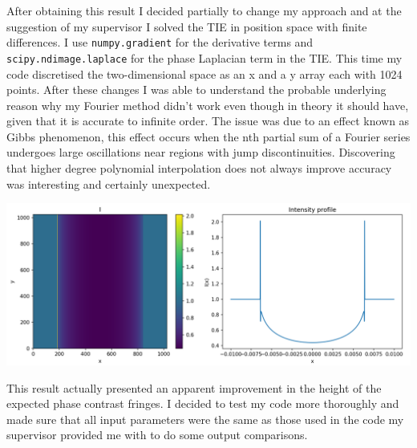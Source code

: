 \documentclass[9pt, a4paper]{article}
\newenvironment{Figure}
    {\par\medskip\noindent\minipage{\linewidth}}
    {\endminipage\par\medskip}
\begin{document}
After obtaining this result I decided partially to change my approach and at the suggestion of my supervisor I solved the TIE in position space with finite differences. I use \texttt{numpy.gradient} for the derivative terms and \texttt{scipy.ndimage.laplace} for the phase Laplacian term in the TIE. This time my code discretised the two-dimensional space as an x and a y array each with 1024 points. 
After these changes I was able to understand the probable underlying reason why my Fourier method didn't work even though in theory it should have, given that it is accurate to infinite order\cite{Chris}\cite{Fornberg}. The issue was due to an effect known as Gibbs phenomenon, this effect occurs when the nth partial sum of a Fourier series undergoes large oscillations near regions with jump discontinuities\cite{Gibbs}. Discovering that higher degree polynomial interpolation does not always improve accuracy was interesting and certainly unexpected.
\begin{Figure}
\centering
\includegraphics[width=\linewidth]{FD_intensity_profile.pdf}
\end{Figure}
This result actually presented an apparent improvement in the height of the expected phase contrast fringes. I decided to test my code more thoroughly and made sure that all input parameters were the same as those used in the code my supervisor provided me with to do some output comparisons.
\end{document}
